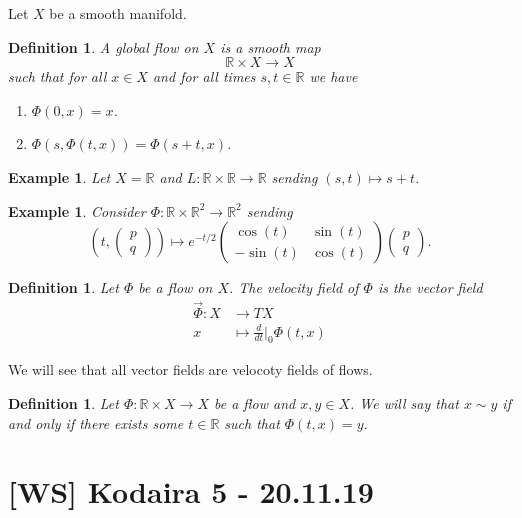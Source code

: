 \documentclass[12pt]{article}
\theoremstyle{darkgreentheorem}
\theoremstyle{darkbluedefinition}
\newtheorem{defn}[thm]{Definition}
\theoremstyle{darkredexample}
\newtheorem{exa}[thm]{Example}
\theoremstyle{remark}
\newcommand{\R}{\mathbb{R}}
\newcommand{\1}{\mathbbm{1}}
\newcommand{\tms}{\times}
\begin{document}
Let $X$ be a smooth manifold.

\begin{defn}
    A \textit{global flow} on $X$ is a smooth map 
    \[ \R\tms X\to X \]
    such that for all $x\in X$ and for all times $s,t\in \R$ we have
    \begin{enumerate}[label=\roman*)]
	\item $\Phi(0,x)=x$.
	\item $\Phi(s,\Phi(t,x))=\Phi(s+t,x)$.
    \end{enumerate}
\end{defn}

\begin{exa}
    Let $X=\R$ and $L\colon \R\tms \R\to \R$ sending $(s,t)\mapsto s+t$.
\end{exa}

\begin{exa}
    Consider $\Phi\colon \R\tms \R^{2}\to \R^{2}$ sending
    \[ \left(t,\begin{pmatrix} p \\ q \end{pmatrix}\right)\mapsto e^{-t/2}\begin{pmatrix} \cos(t) & \sin(t) \\ -\sin(t) & \cos(t) \end{pmatrix} \begin{pmatrix} p \\ q \end{pmatrix}. \]
\end{exa}

\begin{defn}
    Let $\Phi$ be a flow on $X$.
    The \textit{velocity field} of $\Phi$ is the vector field
    \begin{align*}
	\vec{\Phi}\colon X&\longrightarrow TX \\
	x&\longmapsto \frac{d}{dt}|_{0}\Phi(t,x)
    \end{align*}
\end{defn}

We will see that all vector fields are velocoty fields of flows.

\begin{defn}
    Let $\Phi\colon \R\tms X\to X$ be a flow and $x,y\in X$.
    We will say that $x\sim y$ if and only if there exists some $t\in \R$ such that $\Phi(t,x)=y$.
\end{defn}

\section{[WS] Kodaira 5 - 20.11.19}
\end{document}
